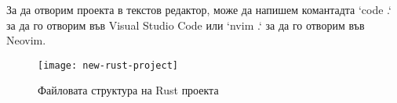 За да отворим проекта в текстов редактор, може да напишем комантадта `code .` за
да го отворим във Visual Studio Code или `nvim .` за да го отворим във Neovim.
 
\begin{figure}[!htb]
  \texttt{[image: new-rust-project]}
  \centering
  \caption{Файловата структура на Rust проекта}
  \label{fig:new-rust-project}
\end{figure}



